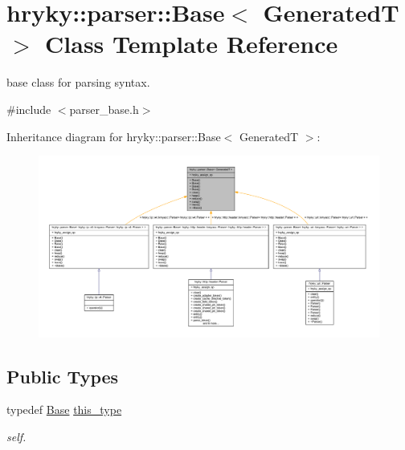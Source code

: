 \hypertarget{classhryky_1_1parser_1_1_base}{\section{hryky\-:\-:parser\-:\-:Base$<$ Generated\-T $>$ Class Template Reference}
\label{classhryky_1_1parser_1_1_base}
}


base class for parsing syntax.  




{\ttfamily \#include $<$parser\-\_\-base.\-h$>$}



Inheritance diagram for hryky\-:\-:parser\-:\-:Base$<$ Generated\-T $>$\-:
\nopagebreak
\begin{figure}[H]
\begin{center}
\leavevmode
\includegraphics[width=350pt]{classhryky_1_1parser_1_1_base__inherit__graph}
\end{center}
\end{figure}
\subsection*{Public Types}
\begin{DoxyCompactItemize}
\item 
\hypertarget{classhryky_1_1parser_1_1_base_af5836311fb3f235ddc6e08809ca2ad68}{typedef \hyperlink{classhryky_1_1parser_1_1_base}{Base} \hyperlink{classhryky_1_1parser_1_1_base_af5836311fb3f235ddc6e08809ca2ad68}{this\-\_\-type}}\label{classhryky_1_1parser_1_1_base_af5836311fb3f235ddc6e08809ca2ad68}

\begin{DoxyCompactList}\small\item\em self. \end{DoxyCompactList}\end{DoxyCompactItemize}
